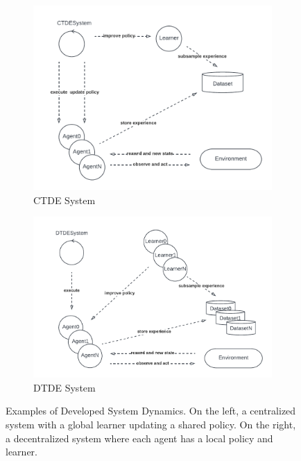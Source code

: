\documentclass[12pt,a4paper,openright,twoside]{book}
\begin{document}
\begin{figure}[t]
    \centering
    \begin{subfigure}[b]{0.49\textwidth}
        \centering
        \includegraphics[width=\textwidth]{img/ctdesystem.pdf}
        \caption{CTDE System \cite{scarlib}}
        \label{fig:ctde}
    \end{subfigure}
    \begin{subfigure}[b]{0.49\textwidth}
        \centering
        \includegraphics[width=\textwidth]{img/DTDE.pdf}
        \caption{DTDE System \cite{scarlib}}
        \label{fig:dtde}
    \end{subfigure}
\caption{Examples of Developed System Dynamics. On the left, a centralized system with a global learner updating a shared policy. On the right, a decentralized system where each agent has a local policy and learner.}
\end{figure}
\end{document}
